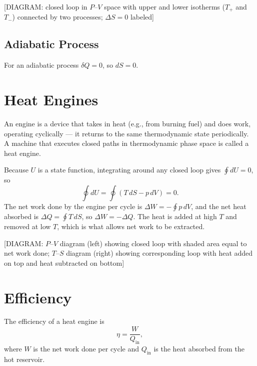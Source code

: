 \begin{center}[DIAGRAM: closed loop in $P$--$V$ space with upper and lower isotherms ($T_+$ and $T_-$) connected by two processes; $\Delta S = 0$ labeled]\end{center}

\subsection{Adiabatic Process}

For an adiabatic process $\delta Q = 0$, so $dS = 0$.

\section{Heat Engines}

\begin{definition}
An engine is a device that takes in heat (e.g., from burning fuel) and does work, operating cyclically --- it returns to the same thermodynamic state periodically. A machine that executes closed paths in thermodynamic phase space is called a heat engine.
\end{definition}

Because $U$ is a state function, integrating around any closed loop gives $\oint dU = 0$, so
\begin{equation}
    \oint dU = \oint (T\,dS - p\,dV) = 0.
\end{equation}
The net work done by the engine per cycle is $\Delta W = -\oint p\,dV$, and the net heat absorbed is $\Delta Q = \oint T\,dS$, so $\Delta W = -\Delta Q$. The heat is added at high $T$ and removed at low $T$, which is what allows net work to be extracted.

\begin{center}[DIAGRAM: $P$--$V$ diagram (left) showing closed loop with shaded area equal to net work done; $T$--$S$ diagram (right) showing corresponding loop with heat added on top and heat subtracted on bottom]\end{center}

\section{Efficiency}

\begin{definition}[Efficiency]
The efficiency of a heat engine is
\begin{equation}
    \eta = \frac{W}{Q_\text{in}},
\end{equation}
where $W$ is the net work done per cycle and $Q_\text{in}$ is the heat absorbed from the hot reservoir.
\end{definition}


